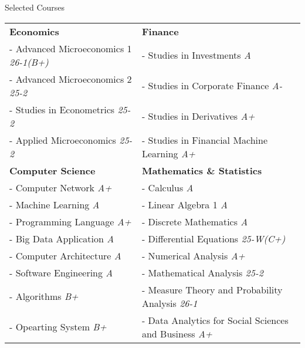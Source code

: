 \documentclass{resume} %
\begin{document}


\begin{rSection}{Selected Courses}
\begin{tabular}{p{} p{}}

\textbf{Economics} & \textbf{Finance} \\
- Advanced Microeconomics 1 \hfill {\em 26-1(B+)} & - Studies in Investments \hfill {\em A} \\
- Advanced Microeconomics 2 \hfill {\em 25-2} & - Studies in Corporate Finance \hfill {\em A-} \\
- Studies in Econometrics \hfill {\em 25-2} & - Studies in Derivatives \hfill {\em A+} \\
- Applied Microeconomics \hfill {\em 25-2} & - Studies in Financial Machine Learning \hfill {\em A+} \\
[10pt]

\textbf{Computer Science} & \textbf{Mathematics \& Statistics}  \\
- Computer Network \hfill {\em A+} & - Calculus \hfill {\em A} \\
- Machine Learning \hfill {\em A} & - Linear Algebra 1 \hfill {\em A} \\
- Programming Language \hfill {\em A+} & - Discrete Mathematics \hfill {\em A} \\
- Big Data Application \hfill {\em A} & - Differential Equations \hfill {\em 25-W(C+)} \\
- Computer Architecture	 \hfill {\em A} & - Numerical Analysis \hfill {\em A+} \\
- Software Engineering \hfill {\em A} & - Mathematical Analysis \hfill {\em 25-2} \\
- Algorithms	 \hfill {\em B+} & - Measure Theory and Probability Analysis \hfill {\em 26-1} \\
- Opearting System \hfill {\em B+} & - Data Analytics for Social Sciences and Business \hfill {\em A+} \\

\end{tabular}
\end{rSection}
\end{document}
